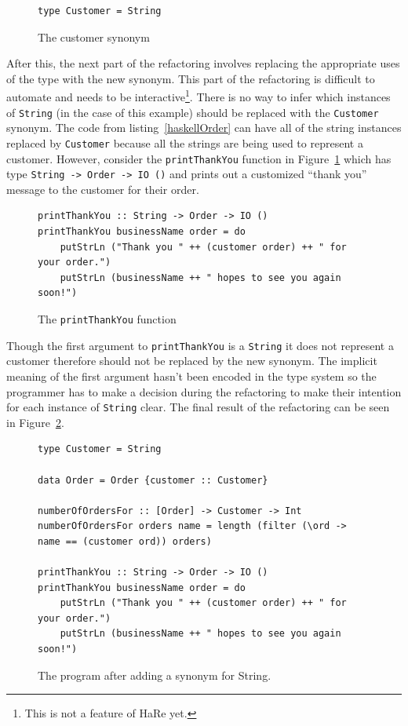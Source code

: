 \begin{figure}[t]
\begin{lstlisting}
type Customer = String
\end{lstlisting}
\caption{The customer synonym}
\end{figure}

After this, the next part of the refactoring involves replacing the appropriate uses of the type with the new synonym. This part of the refactoring is difficult to automate and needs to be interactive\footnote{This is not a feature of HaRe yet.}. There is no way to infer which instances of \texttt{String} (in the case of this example) should be replaced with the \texttt{Customer} synonym. The code from listing~\ref{haskellOrder} can have all of the string instances replaced by \texttt{Customer} because all the strings are being used to represent a customer. However, consider the \texttt{printThankYou} function in Figure~\ref{printTY} which has type \texttt{String -> Order -> IO ()} and prints out a customized ``thank you'' message to the customer for their order. 

\begin{figure}[t]
\begin{lstlisting}
printThankYou :: String -> Order -> IO ()
printThankYou businessName order = do
	putStrLn ("Thank you " ++ (customer order) ++ " for your order.")
	putStrLn (businessName ++ " hopes to see you again soon!")
\end{lstlisting}
\caption{The \texttt{printThankYou} function}
\label{printTY}
\end{figure}

Though the first argument to \texttt{printThankYou} is a \texttt{String} it does not represent a customer therefore should not be replaced by the new synonym. The implicit meaning of the first argument hasn't been encoded in the type system so the programmer has to make a decision during the refactoring to make their intention for each instance of \texttt{String} clear. The final result of the refactoring can be seen in Figure~\ref{orderRefact}. 

\begin{figure}[t]
	\begin{lstlisting}
type Customer = String

data Order = Order {customer :: Customer}

numberOfOrdersFor :: [Order] -> Customer -> Int
numberOfOrdersFor orders name = length (filter (\ord -> name == (customer ord)) orders)

printThankYou :: String -> Order -> IO ()
printThankYou businessName order = do
	putStrLn ("Thank you " ++ (customer order) ++ " for your order.")
	putStrLn (businessName ++ " hopes to see you again soon!")
	\end{lstlisting}
	\caption{The program after adding a synonym for String.}\label{orderRefact}
\end{figure}

